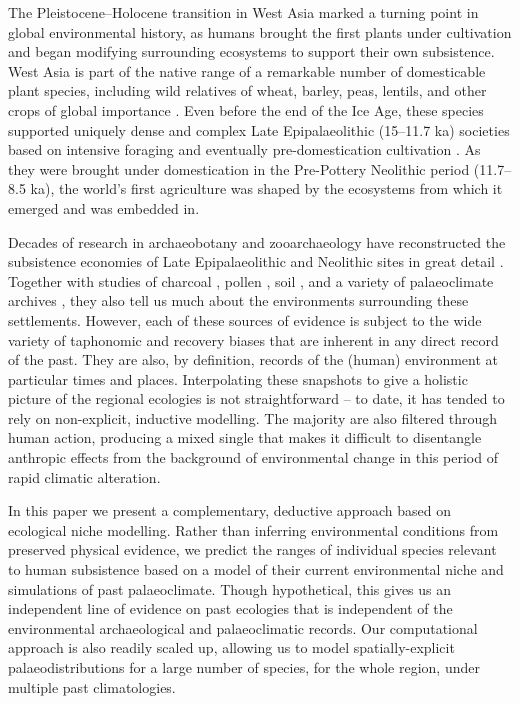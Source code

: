 \documentclass[
  authoryear,
  preprint]{elsarticle}
\begin{document}
The Pleistocene--Holocene transition in West Asia marked a turning point
in global environmental history, as humans brought the first plants
under cultivation and began modifying surrounding ecosystems to support
their own subsistence. West Asia is part of the native range of a
remarkable number of domesticable plant species, including wild
relatives of wheat, barley, peas, lentils, and other crops of global
importance \citep{cite}. Even before the end of the Ice Age, these
species supported uniquely dense and complex Late Epipalaeolithic
(15--11.7 ka) societies based on intensive foraging \citep{cite} and
eventually pre-domestication cultivation \citep{cite}. As they were
brought under domestication in the Pre-Pottery Neolithic period
(11.7--8.5 ka), the world's first agriculture was shaped by the
ecosystems from which it emerged and was embedded in.

Decades of research in archaeobotany and zooarchaeology have
reconstructed the subsistence economies of Late Epipalaeolithic and
Neolithic sites in great detail \citep{cites}. Together with studies of
charcoal \citep{cite}, pollen \citep{cite}, soil \citep{cite}, and a
variety of palaeoclimate archives \citep{JonesEtAl2019}, they also tell
us much about the environments surrounding these settlements. However,
each of these sources of evidence is subject to the wide variety of
taphonomic and recovery biases that are inherent in any direct record of
the past. They are also, by definition, records of the (human)
environment at particular times and places. Interpolating these
snapshots to give a holistic picture of the regional ecologies is not
straightforward -- to date, it has tended to rely on non-explicit,
inductive modelling. The majority are also filtered through human
action, producing a mixed single that makes it difficult to disentangle
anthropic effects from the background of environmental change in this
period of rapid climatic alteration.

In this paper we present a complementary, deductive approach based on
ecological niche modelling. Rather than inferring environmental
conditions from preserved physical evidence, we predict the ranges of
individual species relevant to human subsistence based on a model of
their current environmental niche and simulations of past palaeoclimate.
Though hypothetical, this gives us an independent line of evidence on
past ecologies that is independent of the environmental archaeological
and palaeoclimatic records. Our computational approach is also readily
scaled up, allowing us to model spatially-explicit palaeodistributions
for a large number of species, for the whole region, under multiple past
climatologies.
\end{document}
